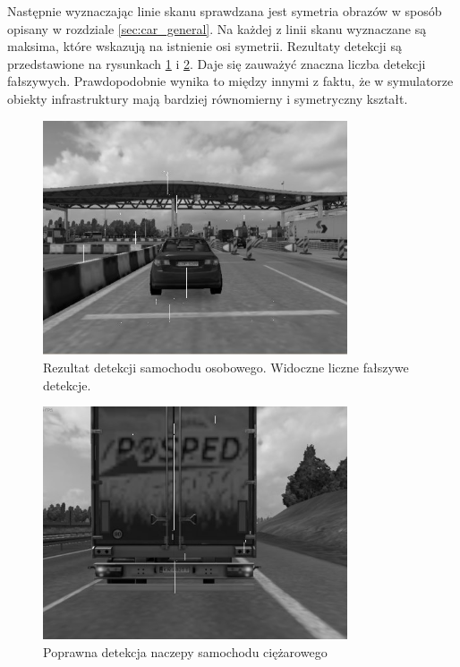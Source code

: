 Następnie wyznaczając linie skanu sprawdzana jest symetria obrazów w sposób opisany w rozdziale \ref{sec:car_general}. %
Na każdej z linii skanu wyznaczane są maksima, które wskazują na istnienie osi symetrii. 
Rezultaty detekcji są przedstawione na rysunkach \ref{fig:alg3_res1} i \ref{fig:alg3_res2}. 
Daje się zauważyć znaczna liczba detekcji fałszywych. 
Prawdopodobnie wynika to między innymi z faktu, że w symulatorze obiekty infrastruktury mają bardziej równomierny i symetryczny kształt.


\begin{figure}
  \centering
  \includegraphics[width=9cm]{img/alg3_res.jpg}
  \caption{Rezultat detekcji samochodu osobowego. Widoczne liczne fałszywe detekcje.}
  \label{fig:alg3_res1}
\end{figure}

\begin{figure}
  \centering
  \includegraphics[width=9cm]{img/alg3_res2.jpg}
  \caption{Poprawna detekcja naczepy samochodu ciężarowego}
  \label{fig:alg3_res2}
\end{figure}

